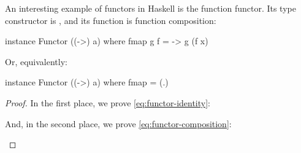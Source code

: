 \begin{example}
  \label{ex:functor-function-haskell}


  An interesting example of functors in Haskell is the function
  functor. Its type constructor is , and its
   function is function composition:
  \begin{codehaskell}
instance Functor ((->) a) where
  fmap g f = \x -> g (f x)
  \end{codehaskell}
  Or, equivalently:
  \begin{codehaskell}
instance Functor ((->) a) where
  fmap = (.)
  \end{codehaskell}


  \begin{proof}

    In the first place, we prove \eqref{eq:functor-identity}:
    \begin{steps}
        \eqby{\eqref{eq:category-identity}}
    \end{steps}
    And, in the second place, we prove \eqref{eq:functor-composition}:
    \begin{steps}
        \eqby{\eqref{eq:category-associativity}}
    \end{steps}

  \end{proof}

\end{example}

